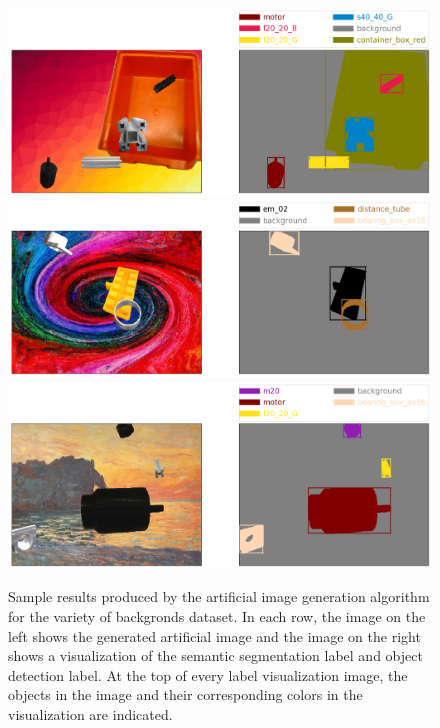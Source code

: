 	\begin{figure}
		\centering
		\includegraphics[scale=0.3]{images/sample_result_1}
		\includegraphics[scale=0.3]{images/sample_result_2}
		\includegraphics[scale=0.3]{images/sample_result_3}
		\caption{Sample results produced by the artificial image generation algorithm for the variety of backgronds dataset. In each row, the image on the left shows the generated artificial image and the image on the right shows a visualization of the semantic segmentation label and object detection label. At the top of every label visualization image, the objects in the image and their corresponding colors in the visualization are indicated.}
		\label{Fig:sample}
	\end{figure}
	
